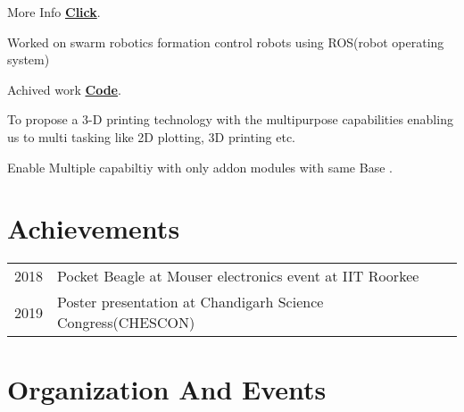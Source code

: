 \documentclass[]{font}
\begin{document}
\begin{minipage}[t]{0.64\textwidth}
\begin{tightemize}
\item More Info \textbf{\href{http://crip.ml}{Click}}.
\item Worked on swarm robotics formation control robots using ROS(robot operating system)
\item Achived work \textbf{\href{https://github.com/pranav083/ROS_work_earlier_nrf}{Code}}.	
\end{tightemize}
\sectionsep

\vspace{\topsep} %
\begin{tightemize}
\item To propose a 3-D printing technology with the multipurpose
capabilities enabling us to multi tasking like 2D plotting, 3D printing etc.
\item Enable Multiple capabiltiy with only addon modules with same Base .
\end{tightemize}
\sectionsep


\section{Achievements} 
\begin{tabular}{rll}
2018	     & Pocket Beagle at Mouser electronics event at IIT Roorkee \\
2019	     & Poster presentation at Chandigarh Science Congress(CHESCON)\\
\end{tabular}
\sectionsep

\section{Organization And Events}
\sectionsep


\end{minipage}
\end{document}
